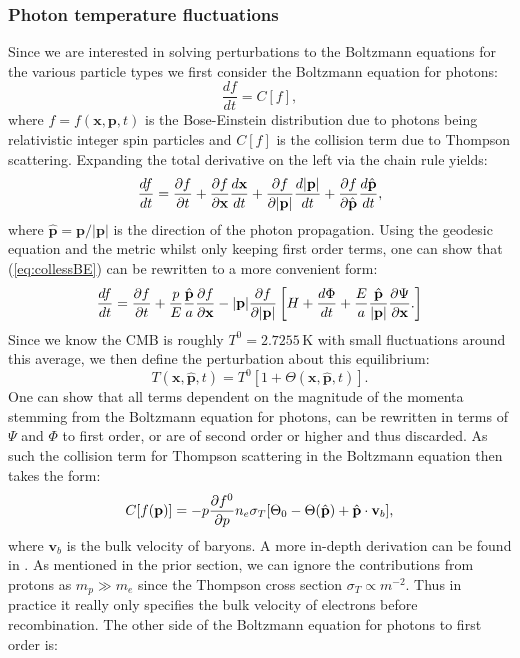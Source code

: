 \documentclass[%
reprint,
 amsmath,amssymb,
 aps,
]{revtex4-2}
\begin{document}
\subsubsection{Photon temperature fluctuations}
Since we are interested in solving perturbations to the Boltzmann equations for the various particle types we first consider the Boltzmann equation for photons:
\[\frac{df}{dt}=C[f],\]
where $f=f(\textbf{x},\textbf{p},t)$ is the Bose-Einstein distribution due to photons being relativistic integer spin particles and $C[f]$ is the collision term due to Thompson scattering. Expanding the total derivative on the left via the chain rule yields:
\begin{equation}
	\frac{df}{dt}=\pdv{f}{t}+\pdv{f}{\textbf{x}}\frac{d\textbf{x}}{dt}+\pdv{f}{|\textbf{p}|}\frac{d|\textbf{p}|}{dt}+\pdv{f}{\hat{\textbf{p}}}\frac{d\hat{\textbf{p}}}{dt},
	\label{eq:collessBE}
\end{equation}
where $\hat{\textbf{p}}=\textbf{p}/|\textbf{p}|$ is the direction of the photon propagation. Using the geodesic equation and the metric whilst only keeping first order terms, one can show that (\ref{eq:collessBE}) can be rewritten to a more convenient form:
\begin{align*}
	\frac{df}{dt}=\pdv{f}{t}+\frac{p}{E}\frac{\hat{\textbf{p}}}{a}\pdv{f}{\textbf{x}}-|\textbf{p}|\pdv{f}{|\textbf{p}|}\left[H+\frac{d\Phi}{dt}+\frac{E}{a}\frac{\hat{\textbf{p}}}{|\textbf{p}|}\pdv{\Psi}{\textbf{x}}.\right]
\end{align*}
Since we know the CMB is roughly $T^{0}=2.7255\,$K with small fluctuations around this average, we then define the perturbation about this equilibrium:
\[T(\textbf{x},\hat{\textbf{p}},t)=T^{0}[1+\Theta(\textbf{x},\hat{\textbf{p}},t)].\]
One can show that all terms dependent on the magnitude of the momenta stemming from the Boltzmann equation for photons, can be rewritten in terms of $\Psi$ and $\Phi$ to first order, or are of second order or higher and thus discarded.  As such the collision term for Thompson scattering in the Boltzmann equation then takes the form:
\begin{equation}
	C[f(\textbf{p})]=-p\pdv{f^{0}}{p}n_e\sigma_T[\Theta_0-\Theta(\hat {\textbf{p}})+\hat{\textbf{p}}\cdot\textbf{v}_b],
	\label{eq:BEgammaR}
\end{equation}
where $\textbf{v}_b$ is the bulk velocity of baryons. A more in-depth derivation can be found in \cite{Dodelson:2003ft}. As mentioned in the prior section, we can ignore the contributions from protons as $m_p\gg m_e$ since the Thompson cross section $\sigma_T\propto m^{-2}$. Thus in practice it really only specifies the bulk velocity of electrons before recombination. The other side of the Boltzmann equation for photons to first order is:
\end{document}

